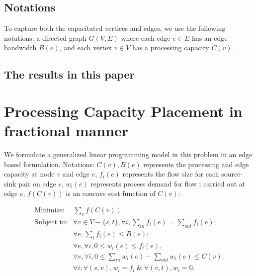 \documentclass[11pt]{article}
\begin{document}
\subsection{Notations}
To capture both the capacitated vertices and edges, we use the following notations:
a directed graph $G(V,E)$ where each edge $e\in E$ has an edge bandwidth $B(e)$, and each vertex $v\in V$ has a processing capacity $C(v)$. 

 


\subsection{The results in this paper}



\section{Processing Capacity Placement in fractional manner}
We formulate a generalized linear programming model in this problem in an edge based formulation. Notations: $C(v),B(e)$ represents the processing and edge capacity at node $v$ and edge $e$, $f_i(e)$ represents the flow size for each source-sink pair on edge $e$, $w_i(e)$ represents process demand for flow i carried out at edge $e$, $f(C(v))$ is an concave cost function of $C(v)$: 

\begin{subequations}
\begin{align}
\text{Minimize:}&\sum\limits_v f(C(v))\\
\text{Subject to:}&\forall v \in V-\{s, t\}, \forall i, \sum\limits_{in}  f_i(e)=  \sum\limits_{out} f_i(e);\\
&\forall e, \sum\limits_{i} f_{i}(e)\leq B(e);\\
&\forall e,\forall  i,0 \leq w_i(e) \leq f_i(e),\\
&\forall v,\forall  i, 0\leq \sum\limits_{in } w_i(e) - \sum\limits_{out} w_i(e)   \leq{C(v)}.\\
&\forall  i; \forall (s, v), w_i = f_i\;\&\; \forall (v,t), w_i =0.
\end{align}
\end{subequations}







\appendix
\end{document}
